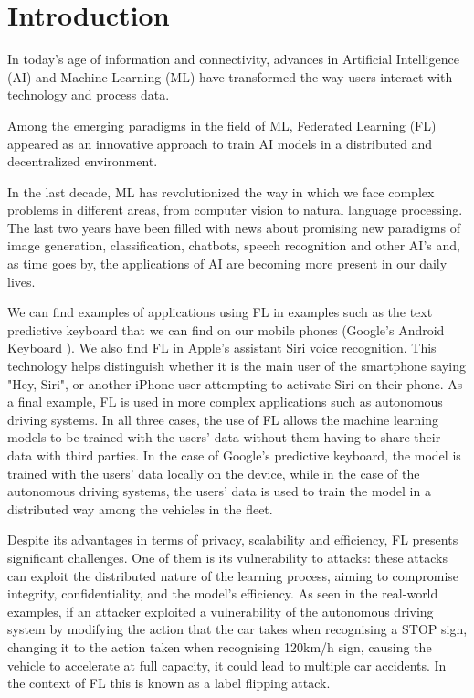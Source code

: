 \section{Introduction}
In today's age of information and connectivity, advances in Artificial Intelligence (AI) and Machine Learning (ML) have transformed the way users interact with technology and process data.

Among the emerging paradigms in the field of ML, Federated Learning (FL) appeared as an innovative approach to train AI models in a distributed and decentralized environment.

In the last decade, ML has revolutionized the way in which we face complex problems in different areas, from computer vision to natural language processing. The last two years have been filled with news about promising new paradigms of image generation, classification, chatbots, speech recognition and other AI's and, as time goes by, the applications of AI are becoming more present in our daily lives.

We can find examples of applications using FL in examples such as the text predictive keyboard that we can find on our mobile phones (Google's Android Keyboard \cite{GoogleKeyboard}). We also find FL in Apple's assistant Siri voice recognition. This technology  helps distinguish whether it is the main user of the smartphone saying "Hey, Siri", or another iPhone user attempting to activate Siri on their phone. As a final example, FL is used in more complex applications such as autonomous driving systems. In all three cases, the use of FL allows the machine learning models to be trained with the users' data without them having to share their data with third parties. In the case of Google's predictive keyboard, the model is trained with the users' data locally on the device, while in the case of the autonomous driving systems, the users' data is used to train the model in a distributed way among the vehicles in the fleet.

Despite its advantages in terms of privacy, scalability and efficiency, FL presents significant challenges. One of them is its vulnerability to attacks: these attacks can exploit the distributed nature of the learning process, aiming to compromise integrity, confidentiality, and the model's efficiency. As seen in the real-world examples, if an attacker exploited a vulnerability of the autonomous driving system by modifying the action that the car takes when recognising a STOP sign, changing it to the action taken when recognising 120km/h sign, causing the vehicle to accelerate at full capacity, it could lead to multiple car accidents. In the context of FL this is known as a label flipping attack.

